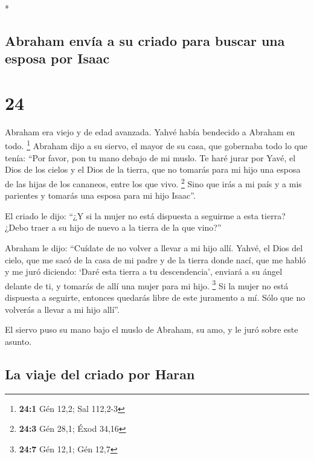 \begin{paracol}{2}
\begin{otherlanguage}{english}
\end{otherlanguage}

\switchcolumn[0]*

\hypertarget{abraham-envuxeda-a-su-criado-para-buscar-una-esposa-por-isaac}{%
\subsection{Abraham envía a su criado para buscar una esposa por
Isaac}\label{abraham-envuxeda-a-su-criado-para-buscar-una-esposa-por-isaac}}

\hypertarget{section-46}{%
\section{24}\label{section-46}}

 Abraham era viejo y de edad avanzada. Yahvé había
bendecido a Abraham en todo. \footnote{\textbf{24:1} Gén 12,2; Sal
  112,2-3}  Abraham dijo a su siervo, el mayor de su casa,
que gobernaba todo lo que tenía: ``Por favor, pon tu mano debajo de mi
muslo.  Te haré jurar por Yavé, el Dios de los cielos y el
Dios de la tierra, que no tomarás para mi hijo una esposa de las hijas
de los cananeos, entre los que vivo. \footnote{\textbf{24:3} Gén 28,1;
  Éxod 34,16}  Sino que irás a mi país y a mis parientes y
tomarás una esposa para mi hijo Isaac''.

 El criado le dijo: ``¿Y si la mujer no está dispuesta a
seguirme a esta tierra? ¿Debo traer a su hijo de nuevo a la tierra de la
que vino?''

 Abraham le dijo: ``Cuídate de no volver a llevar a mi
hijo allí.  Yahvé, el Dios del cielo, que me sacó de la
casa de mi padre y de la tierra donde nací, que me habló y me juró
diciendo: `Daré esta tierra a tu descendencia', enviará a su ángel
delante de ti, y tomarás de allí una mujer para mi hijo. \footnote{\textbf{24:7}
  Gén 12,1; Gén 12,7}  Si la mujer no está dispuesta a
seguirte, entonces quedarás libre de este juramento a mí. Sólo que no
volverás a llevar a mi hijo allí''.

 El siervo puso su mano bajo el muslo de Abraham, su amo,
y le juró sobre este asunto.

\hypertarget{la-viaje-del-criado-por-haran}{%
\subsection{La viaje del criado por
Haran}\label{la-viaje-del-criado-por-haran}}


\end{paracol}
